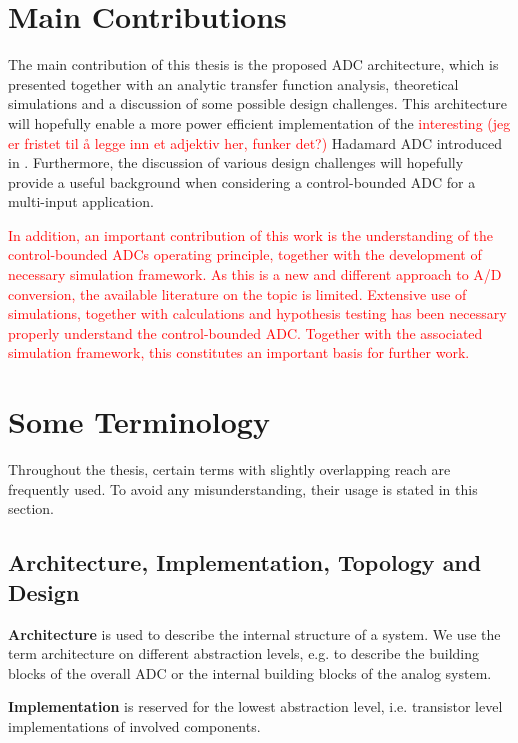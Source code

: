 \section{Main Contributions}
The main contribution of this thesis is the proposed ADC architecture, which is presented together with an analytic transfer function analysis, theoretical simulations and a discussion of some possible design challenges. This architecture will hopefully enable a more power efficient implementation of the \textcolor{red}{interesting (jeg er fristet til å legge inn et adjektiv her, funker det?)} Hadamard ADC introduced in \cite{malmberg_thesis}. Furthermore, the discussion of various design challenges will hopefully provide a useful background when considering a control-bounded ADC for a multi-input application.

\textcolor{red}{In addition, an important contribution of this work is the understanding of the control-bounded ADCs operating principle, together with the development of necessary simulation framework. As this is a new and different approach to A/D conversion, the available literature on the topic is limited. Extensive use of simulations, together with calculations and hypothesis testing has been necessary properly understand the control-bounded ADC. Together with the associated simulation framework, this constitutes an important basis for further work.}






\section{Some Terminology}
Throughout the thesis, certain terms with slightly overlapping reach are frequently used. To avoid any misunderstanding, their usage is stated in this section.

\subsection{Architecture, Implementation, Topology and Design}
\textbf{Architecture} is used to describe the internal structure of a system. We use the term architecture on different abstraction levels, e.g. to describe the building blocks of the overall ADC or the internal building blocks of the analog system.

\textbf{Implementation} is reserved for the lowest abstraction level, i.e. transistor level implementations of involved components.

